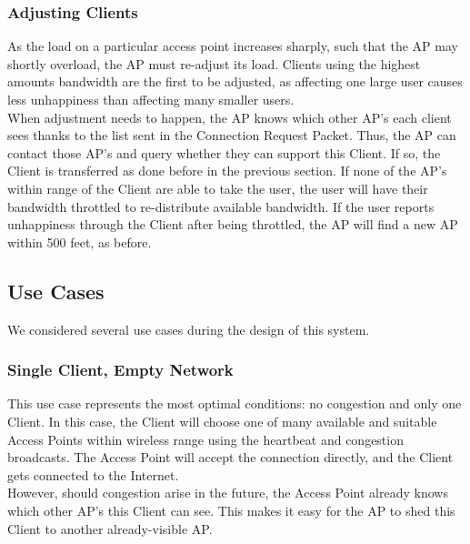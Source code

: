 \documentclass[11pt,twocolumn]{article}
\begin{document}
\subsubsection{Adjusting Clients}
\indent
As the load on a particular access point increases sharply, such that the AP may shortly overload, the AP must re-adjust its load. Clients using the highest amounts 
bandwidth are the first to be adjusted, as affecting one large user causes less unhappiness than affecting many smaller users. \\
\indent
When adjustment needs to happen, the AP knows which other AP's each client sees thanks to the list sent in the Connection 
Request Packet. Thus, the AP can contact those AP's and query whether they can support this Client. If so, the 
Client is transferred as done before in the previous section. If none of the AP's within range of the Client 
are able to take the user, the user will have their bandwidth throttled to re-distribute available bandwidth. If the user 
reports unhappiness through the Client after being throttled, the AP will find a new AP within 500 feet, as before. 

\subsection{Use Cases}
We considered several use cases during the design of this system.
\subsubsection{Single Client, Empty Network}
\indent This use case represents the most optimal conditions: no congestion and only one Client. In this case, the Client will choose one of many available 
and suitable Access Points within wireless range using the heartbeat and congestion broadcasts. The Access Point will accept the connection directly, and the 
Client gets connected to the Internet.\\
\indent However, should congestion arise in the future, the Access Point already knows which other AP's this Client can see. This makes it easy for the AP to
shed this Client to another already-visible AP.
\end{document}
